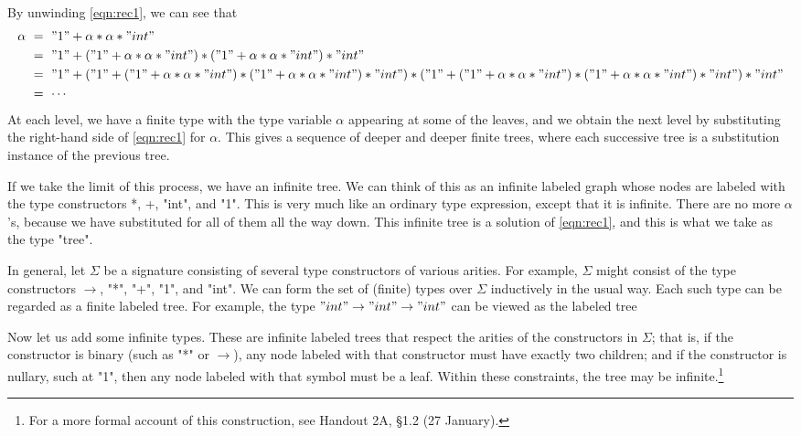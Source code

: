 By unwinding \eqref{eqn:rec1}, we can see that
\begin{align*}
\alpha\ &=\ "1" + \alpha * \alpha * "int"\\
&=\ "1" + ("1" + \alpha * \alpha * "int") * ("1" + \alpha * \alpha * "int") * "int"\\
&=\ "1" + ("1" + ("1" + \alpha * \alpha * "int") * ("1" + \alpha * \alpha * "int") * "int") * ("1" + ("1" + \alpha * \alpha * "int") * ("1" + \alpha * \alpha * "int") * "int") * "int"\\
&=\ \cdots
\end{align*}
At each level, we have a finite type with the type variable $\alpha$ appearing at some of the leaves, and we obtain the next level by substituting the right-hand side of \eqref{eqn:rec1} for $\alpha$. This gives a sequence of deeper and deeper finite trees, where each successive tree is a substitution instance of the previous tree.

If we take the limit of this process, we have an infinite tree. We can think of this as an infinite labeled graph whose nodes are labeled with the type constructors *, +, "int", and "1". This is very much like an ordinary type expression, except that it is infinite. There are no more $\alpha$'s, because we have substituted for all of them all the way down. This infinite tree is a solution of \eqref{eqn:rec1}, and this is what we take as the type "tree".

In general, let $\Sigma$ be a signature consisting of several type constructors of various arities. For example, $\Sigma$ might consist of the type constructors $\to$, "*", "+", "1", and "int". We can form the set of (finite) types over $\Sigma$ inductively in the usual way. Each such type can be regarded as a finite labeled tree. For example, the type $"int" \to "int" \to "int"$ can be viewed as the labeled tree
\begin{center}
\end{center}
Now let us add some infinite types. These are infinite labeled trees that respect the arities of the constructors in $\Sigma$; that is, if the constructor is binary (such as "*" or $\to$), any node labeled with that constructor must have exactly two children; and if the constructor is nullary, such at "1", then any node labeled with that symbol must be a leaf. Within these constraints, the tree may be infinite.\footnote{For a more formal account of this construction, see Handout 2A, \S1.2 (27 January).}

